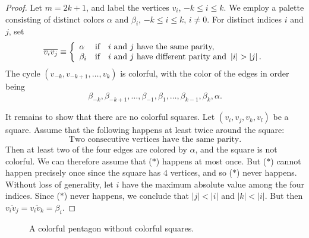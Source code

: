 \documentclass[12pt]{amsart}
\theoremstyle{plain}
\numberwithin{equation}{section}
\begin{document}
\begin{proof}
Let $m=2k+1$, and label the vertices $v_{i}$, $-k\leq i\leq k$. We employ a
palette consisting of distinct colors $\alpha$ and $\beta_{i}$, $-k\leq i\leq
k$, $i\neq0$. For distinct indices $i$ and $j$, set
\begin{displaymath}
    \overline{v_{i}v_{j}}\equiv\left\{
    \begin{array}
    [c]{lll}
    \alpha & \text{if} & i\text{ and }j\text{ have the same parity,}\\
    \beta_{i} & \text{if} & i\text{ and }j\text{ have different parity and
    }\left\vert i\right\vert >\left\vert j\right\vert .
    \end{array}
    \right.
\end{displaymath}
The cycle $\left(  v_{-k},v_{-k+1},\ldots,v_{k}\right)  $ is colorful, with
the color of the edges in order being
\begin{displaymath}
    \beta_{-k},\beta_{-k+1},\ldots,\beta_{-1},\beta_{1},\ldots,\beta_{k-1},
    \beta_{k},\alpha.
\end{displaymath}

It remains to show that there are no colorful squares. Let $\left(
v_{i},v_{j},v_{k},v_{l}\right)  $ be a square. Assume that the following
happens at least twice around the square:
\begin{equation}
\text{Two consecutive vertices have the same parity.} \tag{$\ast$}
\end{equation}
Then at least two of the four edges are colored by $\alpha$, and the square is
not colorful. We can therefore assume that ($\ast$) happens at most once. But
($\ast$) cannot happen precisely once since the square has $4$ vertices, and so
($\ast$) never happens. Without loss of generality, let $i$ have the maximum
absolute value among the four indices. Since ($\ast$) never happens, we
conclude that $|j|<|i|$ and $|k|<|i|$. But then
$\overline{v_{i}v_{j}}=\overline{v_{i}v_{k}}=\beta_{i}$.
\end{proof}

\setlength{\unitlength}{1.2mm}
\begin{figure}[th]
\begin{center}
\begin{small}

\end{small}
\end{center}
\caption{A colorful pentagon without colorful squares.} \label{Fg:Pentagon}
\end{figure}
\end{document}
